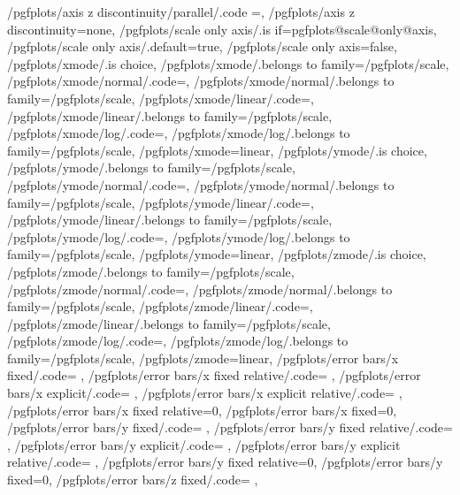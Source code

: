 {	/pgfplots/axis z discontinuity/parallel/.code	={\def\pgfplots@zaxisdiscontnum{2}},
	/pgfplots/axis z discontinuity=none,
	/pgfplots/scale only axis/.is if=pgfplots@scale@only@axis,
	/pgfplots/scale only axis/.default=true,
	/pgfplots/scale only axis=false,
	/pgfplots/xmode/.is choice,
	/pgfplots/xmode/.belongs to family=/pgfplots/scale,
	/pgfplots/xmode/normal/.code={\pgfplots@xislineartrue},
	/pgfplots/xmode/normal/.belongs to family=/pgfplots/scale,
	/pgfplots/xmode/linear/.code={\pgfplots@xislineartrue},
	/pgfplots/xmode/linear/.belongs to family=/pgfplots/scale,
	/pgfplots/xmode/log/.code={\pgfplots@xislinearfalse},
	/pgfplots/xmode/log/.belongs to family=/pgfplots/scale,
	/pgfplots/xmode=linear,
	/pgfplots/ymode/.is choice,
	/pgfplots/ymode/.belongs to family=/pgfplots/scale,
	/pgfplots/ymode/normal/.code={\pgfplots@yislineartrue},
	/pgfplots/ymode/normal/.belongs to family=/pgfplots/scale,
	/pgfplots/ymode/linear/.code={\pgfplots@yislineartrue},
	/pgfplots/ymode/linear/.belongs to family=/pgfplots/scale,
	/pgfplots/ymode/log/.code={\pgfplots@yislinearfalse},
	/pgfplots/ymode/log/.belongs to family=/pgfplots/scale,
	/pgfplots/ymode=linear,
	/pgfplots/zmode/.is choice,
	/pgfplots/zmode/.belongs to family=/pgfplots/scale,
	/pgfplots/zmode/normal/.code={\pgfplots@zislineartrue},
	/pgfplots/zmode/normal/.belongs to family=/pgfplots/scale,
	/pgfplots/zmode/linear/.code={\pgfplots@zislineartrue},
	/pgfplots/zmode/linear/.belongs to family=/pgfplots/scale,
	/pgfplots/zmode/log/.code={\pgfplots@zislinearfalse},
	/pgfplots/zmode/log/.belongs to family=/pgfplots/scale,
	/pgfplots/zmode=linear,
	/pgfplots/error bars/x fixed/.code=				\def\pgfplots@errorbars@xfixed{#1}\def\pgfplots@errorbars@xmode{0},
	/pgfplots/error bars/x fixed relative/.code=		\def\pgfplots@errorbars@xrel{#1}\def\pgfplots@errorbars@xmode{1},
	/pgfplots/error bars/x explicit/.code=			\def\pgfplots@errorbars@xmode{2},
	/pgfplots/error bars/x explicit relative/.code=	\def\pgfplots@errorbars@xmode{3},
	/pgfplots/error bars/x fixed relative=0,
	/pgfplots/error bars/x fixed=0,
	/pgfplots/error bars/y fixed/.code=				\def\pgfplots@errorbars@yfixed{#1}\def\pgfplots@errorbars@ymode{0},
	/pgfplots/error bars/y fixed relative/.code=		\def\pgfplots@errorbars@yrel{#1}\def\pgfplots@errorbars@ymode{1},
	/pgfplots/error bars/y explicit/.code=			\def\pgfplots@errorbars@ymode{2},
	/pgfplots/error bars/y explicit relative/.code=	\def\pgfplots@errorbars@ymode{3},
	/pgfplots/error bars/y fixed relative=0,
	/pgfplots/error bars/y fixed=0,
	/pgfplots/error bars/z fixed/.code=				\def\pgfplots@errorbars@zfixed{#1}\def\pgfplots@errorbars@zmode{0},
}
